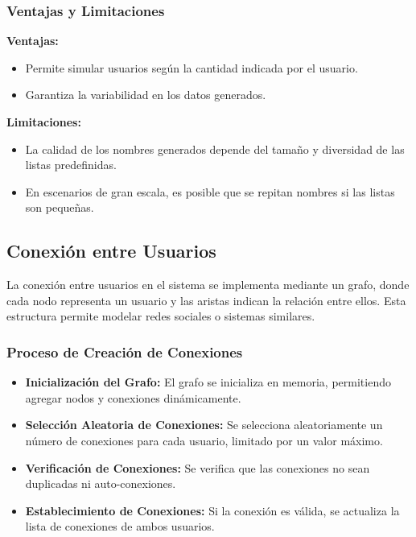 \documentclass[9pt,letterpaper,onecolumn]{rho-class/rho}
\begin{document}
    \subsubsection{Ventajas y Limitaciones}
    \textbf{Ventajas:}
    \begin{itemize}
        \item Permite simular usuarios según la cantidad indicada por el usuario.
        \item Garantiza la variabilidad en los datos generados.
    \end{itemize}
    \textbf{Limitaciones:}
    \begin{itemize}
        \item La calidad de los nombres generados depende del tamaño y diversidad de las listas predefinidas.
        \item En escenarios de gran escala, es posible que se repitan nombres si las listas son pequeñas.
    \end{itemize}

    \subsection{Conexión entre Usuarios}
    La conexión entre usuarios en el sistema se implementa mediante un grafo, donde cada nodo representa un usuario y las aristas indican la relación entre ellos.
    Esta estructura permite modelar redes sociales o sistemas similares.

    \subsubsection{Proceso de Creación de Conexiones}
    \begin{itemize}
        \item \textbf{Inicialización del Grafo:} El grafo se inicializa en memoria, permitiendo agregar nodos y conexiones dinámicamente.
        \item \textbf{Selección Aleatoria de Conexiones:} Se selecciona aleatoriamente un número de conexiones para cada usuario, limitado por un valor máximo.
        \item \textbf{Verificación de Conexiones:} Se verifica que las conexiones no sean duplicadas ni auto-conexiones.
        \item \textbf{Establecimiento de Conexiones:} Si la conexión es válida, se actualiza la lista de conexiones de ambos usuarios.
    \end{itemize}
\end{document}
